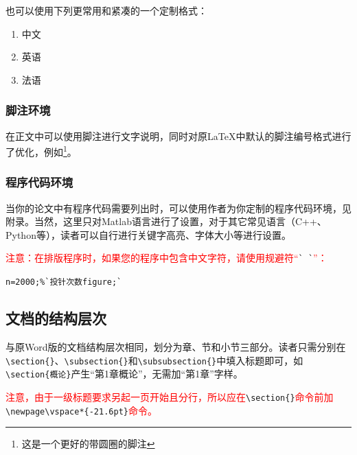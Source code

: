 也可以使用下列更常用和紧凑的一个定制格式：
\begin{enumerate}[itemsep=0pt,parsep=0pt,label=(\arabic*)]
  \item 中文
  \item 英语
  \item 法语
\end{enumerate}

\subsubsection{脚注环境}
在正文中可以使用脚注进行文字说明，同时对原\LaTeX 中默认的脚注编号格式进行了优化，例如\footnote{这是一个更好的带圆圈的脚注}。

\subsubsection{程序代码环境}
当你的论文中有程序代码需要列出时，可以使用作者为你定制的程序代码环境，见附录。当然，这里只对Matlab语言进行了设置，对于其它常见语言（C++、Python等），读者可以自行进行关键字高亮、字体大小等进行设置。

\textcolor{red}{注意：在排版程序时，如果您的程序中包含中文字符，请使用规避符“}\verb"` `"\textcolor{red}{”：}

\verb"n=2000;%`投针次数figure;`"

\subsection{文档的结构层次}
与原Word版的文档结构层次相同，划分为章、节和小节三部分。读者只需分别在\verb"\section{}"、\verb"\subsection{}"和\verb"\subsubsection{}"中填入标题即可，如\\
\verb"\section{概论}"产生“第1章\quad 概论”，无需加“第1章”字样。

\textcolor{red}{注意，由于一级标题要求另起一页开始且分行，所以应在}\verb"\section{}"\textcolor{red}{命令前加}\verb"\newpage\vspace*{-21.6pt}"\textcolor{red}{命令。}

